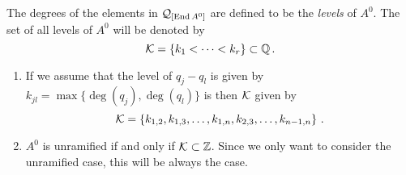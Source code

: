 \begin{defn}
\begin{s-rem}
\begin{enumerate}
\begin{comment}
        \end{comment}
    \end{enumerate}
  \end{s-rem}
  The degrees of the elements in $\mathcal{Q}_{[\operatorname{End} A^0]}$ are defined to be  the
  \emph{levels} of $A^0$.
  The set of all levels of $A^0$ will be denoted by
  \[
    \mathcal{K}=\{k_1<\dots<k_r\} \subset \mathbb{Q} \,.
  \]
  \begin{s-rem}
    \begin{enumerate}
      \item If we assume that the level of $q_j-q_l$ is given by
        $k_{jl}=\max\{\deg(q_j),\deg(q_l)\}$ is then $\mathcal{K}$ given by
        \[
          \mathcal{K}=\left\{
            k_{1,2},
            k_{1,3},\dots,
            k_{1,n},
            k_{2,3},\dots,
            k_{n-1,n}
          \right\}\,.
        \]
      \item $A^0$ is unramified if and only if $\mathcal{K}\subset\mathbb{Z}$. Since we only
        want to consider the unramified case, this will be always the case.
    \end{enumerate}
  \end{s-rem}
\end{defn}

\begin{comment}
  \TODO[Add definitions for \emph{maximal dacay}]
  \begin{defn}
    \marginnote{\cite[130]{hotta2008}, \cite[79]{Loday2014}}
    A function is \emph{of maximal decay}, if \PROBLEM{}
    \begin{s-rem}
      \marginnote{\cite[79]{Loday2014}}
      An exponential $e^{q(1/t)}=e^{-\frac{a}{t^{k}}(x+o(t^{-k}))}$ has maximal
      decay in a direction $\tilde\theta\in S^1$ if and only if
      $-ae^{-ik\tilde\theta}$ is real negative.
    \end{s-rem}

    \comm{On the other hand, is a function is \emph{flat}, if\dots}
  \end{defn}
\end{comment}

